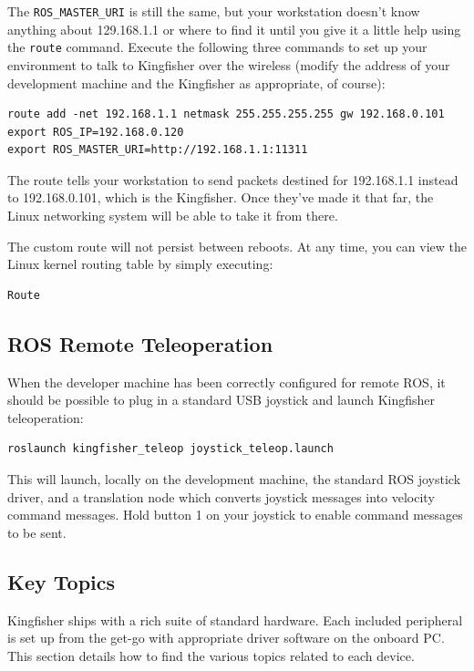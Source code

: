 \documentclass[]{clearpath-latex/clearpath-manual}
\begin{document}
The \lstinline{ROS_MASTER_URI} is still the same, but your workstation doesn’t know anything about 129.168.1.1 or where to find it until you give it a little help using the \lstinline{route} command. Execute the following three commands to set up your environment to talk to Kingfisher over the wireless (modify the address of your development machine and the Kingfisher as appropriate, of course):

\begin{lstlisting}
route add -net 192.168.1.1 netmask 255.255.255.255 gw 192.168.0.101 
export ROS_IP=192.168.0.120 
export ROS_MASTER_URI=http://192.168.1.1:11311 
\end{lstlisting}

The route tells your workstation to send packets destined for 192.168.1.1 instead to 192.168.0.101, which is the Kingfisher. Once they’ve made it that far, the Linux networking system will be able to take it from there.

The custom route will not persist between reboots. At any time, you can view the Linux kernel routing table by simply executing:

\begin{lstlisting}
Route
\end{lstlisting}

\subsection{ROS Remote Teleoperation}

When the developer machine has been correctly configured for remote ROS, it should be possible to plug in a standard USB joystick and launch Kingfisher teleoperation:

\begin{lstlisting}
roslaunch kingfisher_teleop joystick_teleop.launch
\end{lstlisting}

This will launch, locally on the development machine, the standard ROS joystick driver, and a translation node which converts joystick messages into velocity command messages. Hold button 1 on your joystick to enable command messages to be sent.

\pagebreak

\subsection{Key Topics}
Kingfisher ships with a rich suite of standard hardware. Each included peripheral is set up from the get-go with appropriate driver software on the onboard PC. This section details how to find the various topics related to each device.
\end{document}
